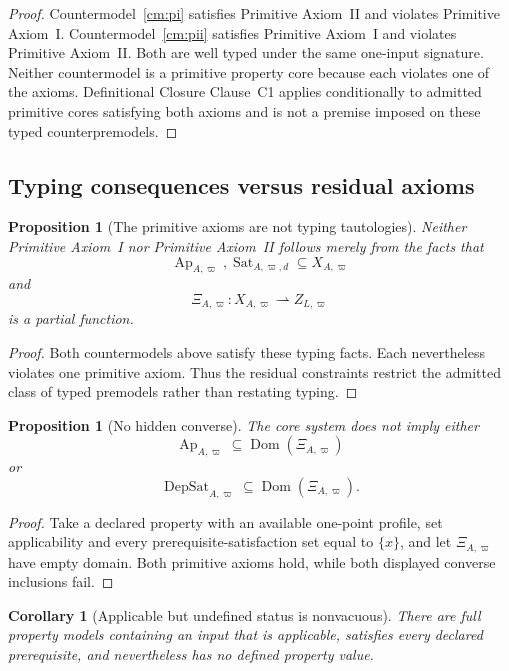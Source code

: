 \documentclass[11pt]{article}
\newcommand{\Ap}{\operatorname{Ap}}
\newcommand{\DepSat}{\operatorname{DepSat}}
\newcommand{\Sat}{\operatorname{Sat}}
\newcommand{\Dom}{\operatorname{Dom}}
\newtheorem{proposition}[theorem]{Proposition}
\newtheorem{corollary}[theorem]{Corollary}
\theoremstyle{definition}
\theoremstyle{remark}
\begin{document}
\begin{proof}
Countermodel~\ref{cm:pi} satisfies Primitive Axiom~II and violates Primitive Axiom~I.
Countermodel~\ref{cm:pii} satisfies Primitive Axiom~I and violates Primitive Axiom~II.
Both are well typed under the same one-input signature.
Neither countermodel is a primitive property core because each violates one of the axioms.
Definitional Closure Clause~C1 applies conditionally to admitted primitive cores satisfying both axioms and is not a premise imposed on these typed counterpremodels.
\end{proof}

\subsection{Typing consequences versus residual axioms}

\begin{proposition}[The primitive axioms are not typing tautologies]
Neither Primitive Axiom~I nor Primitive Axiom~II follows merely from the facts that
\[
\Ap_{A,\varpi},\Sat_{A,\varpi,d}\subseteq X_{A,\varpi}
\]
and
\[
\Xi_{A,\varpi}:X_{A,\varpi}\rightharpoonup Z_{L,\varpi}
\]
is a partial function.
\end{proposition}

\begin{proof}
Both countermodels above satisfy these typing facts.
Each nevertheless violates one primitive axiom.
Thus the residual constraints restrict the admitted class of typed premodels rather than restating typing.
\end{proof}

\begin{proposition}[No hidden converse]
The core system does not imply either
\[
\Ap_{A,\varpi}\subseteq\Dom(\Xi_{A,\varpi})
\]
or
\[
\DepSat_{A,\varpi}\subseteq\Dom(\Xi_{A,\varpi}).
\]
\end{proposition}

\begin{proof}
Take a declared property with an available one-point profile, set applicability and every prerequisite-satisfaction set equal to \(\{x\}\), and let \(\Xi_{A,\varpi}\) have empty domain.
Both primitive axioms hold, while both displayed converse inclusions fail.
\end{proof}

\begin{corollary}[Applicable but undefined status is nonvacuous]
There are full property models containing an input that is applicable, satisfies every declared prerequisite, and nevertheless has no defined property value.
\end{corollary}
\end{document}
